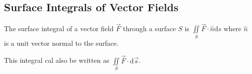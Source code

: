 \subsection{Surface Integrals of Vector Fields}
\begin{definition}
	The surface integral of a vector field $\vec{F}$ through a surface $S$ is $\iint\limits_{S}{\vec{F} \cdot \hat{n}\mathrm{d}s}$ where $\hat{n}$ is a unit vector normal to the surface.
\end{definition}
\noindent
This integral cal also be written as $\iint\limits_{S}{\vec{F} \cdot \mathrm{d}\vec{s}}$.

